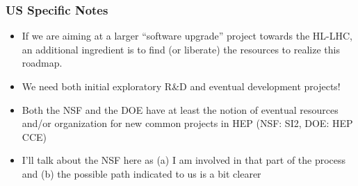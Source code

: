 \begin{frame}
\frametitle{US Specific Notes}

\begin{itemize}
\item If we are aiming at a larger ``software upgrade'' project towards the HL-LHC, an additional ingredient is to find (or liberate) the resources to realize this roadmap. 
\item We need both initial exploratory R\&D and eventual development projects!
\item Both the NSF and the DOE have at least the notion of eventual resources and/or organization for new common projects in HEP (NSF: SI2, DOE: HEP CCE)
\item I'll talk about the NSF here as (a) I am involved in that part of the process and (b) the possible path indicated to us is a bit clearer
\end{itemize}

\end{frame}


